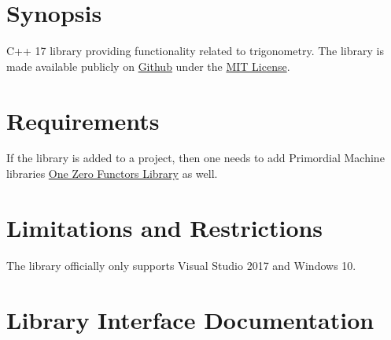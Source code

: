 \documentclass[oneside]{book}
\begin{document}
\frontmatter

\begin{titlepage}
\maketitle
\end{titlepage}

\tableofcontents
{}

\mainmatter

\chapter{Synopsis}
C++ 17 library providing functionality related to trigonometry.
The library is made available publicly on
\href{\GetLibraryRepository}{Github}
under the
\href{\GetLibraryRepository/blob/master/LICENSE}{MIT License}.

\chapter{Requirements}
If the library is added to a project, then one needs to add Primordial Machine libraries
\href{https://github.com/primordialmachine/one-zero-functors}{One Zero Functors Library}
as well.

\chapter{Limitations and Restrictions}
The library officially only supports Visual Studio 2017 and Windows 10.




\chapter{Library Interface Documentation}
\end{document}
